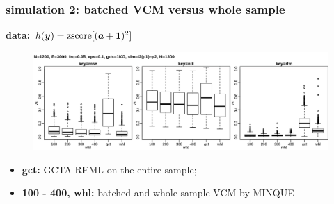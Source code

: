 \documentclass{beamer}
\begin{document}
\begin{frame}\frametitle{simulation 2: batched VCM versus whole sample}
  \textbf{data: $h({\bm{y}})=\text{zscore}[({\bm{a}} + \mathbf{1})^2]$} \\
  \begin{figure}
    \centering \includegraphics[width=1\linewidth]{img/1kg_bat_p02}
  \end{figure}
  \textbf{\color{blue}{inner plot: strategies, from left to right:}}
  \begin{itemize}
  \item \textbf{gct:} GCTA-REML on the entire sample;
  \item \textbf{100 - 400, whl:} batched and whole sample VCM by MINQUE
  \end{itemize}
\end{frame}
\end{document}
